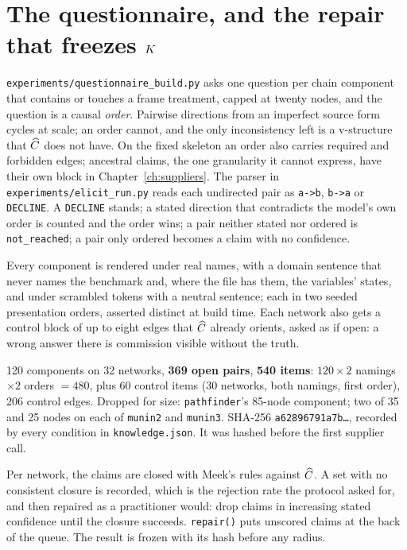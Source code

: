 \section{The questionnaire, and the repair that freezes \texorpdfstring{$K$}{K}}\label{sec:frame-questionnaire}

\texttt{experiments/questionnaire\_build.py} asks one question per chain component that contains or
touches a frame treatment, capped at twenty nodes, and the question is a causal \emph{order}.
Pairwise directions from an imperfect source form cycles at scale; an order cannot, and the only
inconsistency left is a v-structure that $\widehat{C}$ does not have. On the fixed skeleton an order also
carries required and forbidden edges; ancestral claims, the one granularity it cannot express, have
their own block in Chapter~\ref{ch:suppliers}. The parser in \texttt{experiments/elicit\_run.py} reads
each undirected pair as \texttt{a->b}, \texttt{b->a} or \texttt{DECLINE}. A \texttt{DECLINE} stands; a
stated direction that contradicts the model's own order is counted and the order wins; a pair neither
stated nor ordered is \texttt{not\_reached}; a pair only ordered becomes a claim with no confidence.

Every component is rendered under real names, with a domain sentence that never names the benchmark
and, where the file has them, the variables' states, and under scrambled tokens with a neutral sentence; each in two seeded
presentation orders, asserted distinct at build time. Each network also gets a control block of up to
eight edges that $\widehat{C}$ already orients, asked as if open: a wrong answer there is commission visible
without the truth.

\begin{medido}
120 components on 32 networks, \textbf{369 open pairs}, \textbf{540 items}: $120 \times 2$ namings
$\times 2$ orders $= 480$, plus 60 control items (30 networks, both namings, first order), 206 control
edges. Dropped for size: \texttt{pathfinder}'s 85-node component; two of 35 and 25 nodes on each of
\texttt{munin2} and \texttt{munin3}. SHA-256 \texttt{a62896791a7b\ldots}, recorded by every condition in
\texttt{knowledge.json}. It was hashed before the first supplier call.
\end{medido}

Per network, the claims are closed with Meek's rules against $\widehat{C}$. A set with no consistent closure
is recorded, which is the rejection rate the protocol asked for, and then repaired as a practitioner
would: drop claims in increasing stated confidence until the closure succeeds. \texttt{repair()} puts
unscored claims at the back of the queue. The result is frozen with its hash before any radius.

